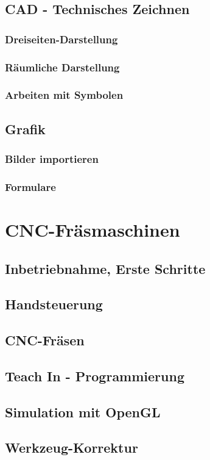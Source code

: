 \documentclass[a4paper]{book}
\begin{document}
	\section{CAD - Technisches Zeichnen}
		\subsection{Dreiseiten-Darstellung}
		\subsection{Räumliche Darstellung}
		\subsection{Arbeiten mit Symbolen}
	\section{Grafik}
		\subsection{Bilder importieren}
		\subsection{Formulare}
	 
\chapter{CNC-Fräsmaschinen} 
	\section{Inbetriebnahme, Erste Schritte}
	\section{Handsteuerung}
	\section{CNC-Fräsen}
	\section{Teach In - Programmierung} 
	\section{Simulation mit OpenGL} 
	\section{Werkzeug-Korrektur} 
\end{document}
